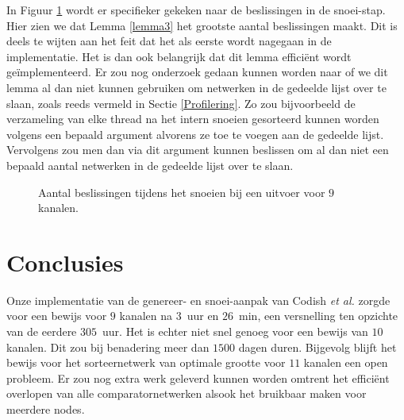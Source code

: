 \documentclass{article}
\begin{document}
In Figuur \ref{AantalSnoeiBeslissingen9Kanalen} wordt er specifieker gekeken naar de beslissingen in de snoei-stap.
Hier zien we dat Lemma \ref{lemma3} het grootste aantal beslissingen maakt.
Dit is deels te wijten aan het feit dat het als eerste wordt nagegaan in de implementatie.
Het is dan ook belangrijk dat dit lemma effici\"ent wordt ge\"implementeerd.
Er zou nog onderzoek gedaan kunnen worden naar of we dit lemma al dan niet kunnen gebruiken om netwerken in de gedeelde lijst over te slaan, zoals reeds vermeld in Sectie \ref{Profilering}.
Zo zou bijvoorbeeld de verzameling van elke thread na het intern snoeien gesorteerd kunnen worden volgens een bepaald argument alvorens ze toe te voegen aan de gedeelde lijst.
Vervolgens zou men dan via dit argument kunnen beslissen om al dan niet een bepaald aantal netwerken in de gedeelde lijst over te slaan.
\begin{figure}[!h]
\centering
\caption{Aantal beslissingen tijdens het snoeien bij een uitvoer voor $9$ kanalen.}
\label{AantalSnoeiBeslissingen9Kanalen}
\end{figure}

\section{Conclusies}
Onze implementatie van de genereer- en snoei-aanpak van Codish \textit{et al.} zorgde voor een bewijs voor $9$ kanalen na $3$~uur en $26$~min, een versnelling ten opzichte van de eerdere $305$~uur.
Het is echter niet snel genoeg voor een bewijs van $10$ kanalen.
Dit zou bij benadering meer dan $1500$ dagen duren.
Bijgevolg blijft het bewijs voor het sorteernetwerk van optimale grootte voor $11$ kanalen een open probleem.
Er zou nog extra werk geleverd kunnen worden omtrent het effici\"ent overlopen van alle comparatornetwerken alsook het bruikbaar maken voor meerdere nodes.
\end{document}
